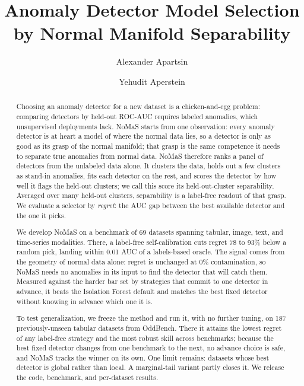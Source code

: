 \documentclass[3p,twocolumn]{elsarticle}
\begin{document}
\begin{frontmatter}
\title{\vspace*{-2\baselineskip}Anomaly Detector Model Selection by Normal Manifold Separability}

\author[hit]{Alexander Apartsin}
\author[afeka]{Yehudit Aperstein}
\address[hit]{School of Computer Science, Faculty of Sciences, Holon Institute of Technology (HIT), Holon, Israel}
\address[afeka]{Intelligent Systems, Afeka Academic College of Engineering, Tel-Aviv, Israel}

\begin{abstract}
Choosing an anomaly detector for a new dataset is a chicken-and-egg problem: comparing detectors by held-out ROC-AUC requires labeled anomalies, which unsupervised deployments lack. NoMaS starts from one observation: every anomaly detector is at heart a model of where the normal data lies, so a detector is only as good as its grasp of the normal manifold; that grasp is the same competence it needs to separate true anomalies from normal data. NoMaS therefore ranks a panel of detectors from the unlabeled data alone. It clusters the data, holds out a few clusters as stand-in anomalies, fits each detector on the rest, and scores the detector by how well it flags the held-out clusters; we call this score its held-out-cluster separability. Averaged over many held-out clusters, separability is a label-free readout of that grasp. We evaluate a selector by \emph{regret}: the AUC gap between the best available detector and the one it picks.

We develop NoMaS on a benchmark of 69 datasets spanning tabular, image, text, and time-series modalities. There, a label-free self-calibration cuts regret 78 to 93\% below a random pick, landing within 0.01 AUC of a labels-based oracle. The signal comes from the geometry of normal data alone: regret is unchanged at 0\% contamination, so NoMaS needs no anomalies in its input to find the detector that will catch them. Measured against the harder bar set by strategies that commit to one detector in advance, it beats the Isolation Forest default and matches the best fixed detector without knowing in advance which one it is.

To test generalization, we freeze the method and run it, with no further tuning, on 187 previously-unseen tabular datasets from OddBench. There it attains the lowest regret of any label-free strategy and the most robust skill across benchmarks; because the best fixed detector changes from one benchmark to the next, no advance choice is safe, and NoMaS tracks the winner on its own. One limit remains: datasets whose best detector is global rather than local. A marginal-tail variant partly closes it. We release the code, benchmark, and per-dataset results.
\end{abstract}

\end{frontmatter}
\end{document}
